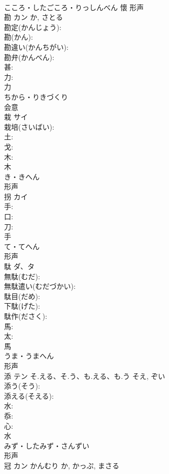 \documentclass[8pt]{extreport}
\begin{document}
\begin{CJK}{UTF8}{min}
\\	こころ・したごころ・りっしんべん	懷	形声 
\\	勘	カン		か, さとる	
\\	勘定(かんじょう): 
\\	勘(かん): 
\\	勘違い(かんちがい): 
\\	勘弁(かんべん): 
\\	甚: 
\\	力: 
\\	力	
\\	ちから・りきづくり	
\\	会意 
\\	栽	サイ			
\\	栽培(さいばい): 
\\	土: 
\\	戈: 
\\	木: 
\\	木	
\\	き・きへん	
\\	形声 
\\	拐	カイ			
\\	手: 
\\	口: 
\\	刀: 
\\	手	
\\	て・てへん	
\\	形声 
\\	駄	ダ、タ			
\\	無駄(むだ): 
\\	無駄遣い(むだづかい): 
\\	駄目(だめ): 
\\	下駄(げた): 
\\	駄作(ださく): 
\\	馬: 
\\	太: 
\\	馬	
\\	うま・うまへん	
\\	形声 
\\	添	テン	そ.える、そ.う、も.える、も.う	そえ, ぞい	
\\	添う(そう): 
\\	添える(そえる): 
\\	水: 
\\	忝: 
\\	心: 
\\	水	
\\	みず・したみず・さんずい	
\\	形声 
\\	冠	カン	かんむり	か, かっぷ, まさる	

\end{CJK}
\end{document}
